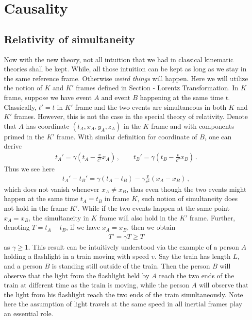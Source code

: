 \documentclass[11pt, onesided]{book}
\theoremstyle{break}
\theoremstyle{break}
\begin{document}
\section[Causality]{\color{red}Causality\color{black}}
\subsection{Relativity of simultaneity}
Now with the new theory, not all intuition that we had in classical kinematic theories shall be kept. While, all those intuition can be kept as long as we stay in the same reference frame. Otherwise \textit{weird things} will happen. Here we will utilize the notion of $K$ and $K'$ frames defined in Section - Lorentz Transformation. In $K$ frame, suppose we have event $A$ and event $B$ happening at the same time $t$. Classically, $t' =t$ in $K'$ frame and the two events are simultaneous in both $K$ and $K'$ frames. However, this is not the case in the special theory of relativity. Denote that $A$ has coordinate $(t_A,x_A,y_A,z_A)$ in the $K$ frame and with components primed in the $K'$ frame. With similar definition for coordinate of $B$, one can derive
\begin{align*}
t_A' = \gamma\left(t_A - \frac{v}{c^2}x_A\right)\,,\qquad
t_B' = \gamma\left(t_B - \frac{v}{c^2} x_B\right)\,.
\end{align*}
Thus we see here
\begin{align}
t_A' - t_B' = \gamma(t_A - t_B) -\gamma \frac{v}{c^2}\left(x_A - x_B\right)\,,
\end{align}
which does not vanish whenever $x_A \neq x_B$, thus even though the two events might happen at the same time $t_A = t_B$ in frame $K$, such notion of simultaneity does not hold in the frame $K'$. While if the two events happen at the same point $x_A = x_B$, the simultaneity in $K$ frame will also hold in the $K'$ frame. Further, denoting $T = t_A - t_B$, if we have $x_A = x_B$, then we obtain
\begin{align*}
T' = \gamma T \geq T
\end{align*}
as $\gamma \geq 1$. This result can be intuitively understood via the example of a person $A$ holding a flashlight in a train moving with speed $v$. Say the train has length $L$, and a person $B$ is standing still outside of the train. Then the person $B$ will observe that the light from the flashlight held by $A$ reach the two ends of the train at different time as the train is moving, while the person $A$ will observe that the light from his flashlight reach the two ends of the train simultaneously. Note here the assumption of light travels at the same speed in all inertial frames play an essential role. \\
\end{document}
